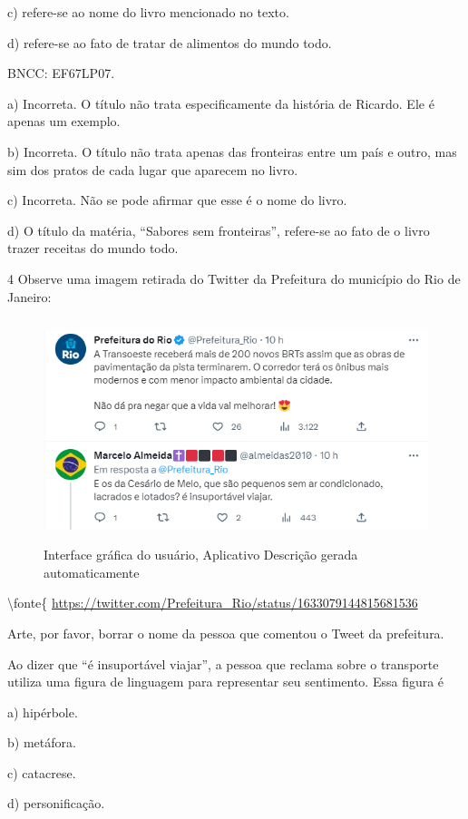 {c) refere-se ao nome do livro mencionado no texto.

d) refere-se ao fato de tratar de alimentos do mundo todo.

BNCC: EF67LP07.

a) Incorreta. O título não trata especificamente da história de Ricardo.
Ele é apenas um exemplo.

b) Incorreta. O título não trata apenas das fronteiras entre um país e
outro, mas sim dos pratos de cada lugar que aparecem no livro.

c) Incorreta. Não se pode afirmar que esse é o nome do livro.

d) O título da matéria, ``Sabores sem fronteiras'', refere-se ao fato de
o livro trazer receitas do mundo todo.

\num{4} Observe uma imagem retirada do Twitter da Prefeitura do
município do Rio de Janeiro:

\begin{figure}
\centering
\includegraphics[width=4.97543in,height=2.56689in]{./imgSAEB_6_POR/media/image6.png}
\caption{Interface gráfica do usuário, Aplicativo Descrição gerada
automaticamente}
\end{figure}

\textbackslash fonte\{
\href{https://twitter.com/Prefeitura_Rio/status/1633079144815681536}{{https://twitter.com/Prefeitura\_Rio/status/1633079144815681536}}

Arte, por favor, borrar o nome da pessoa que comentou o Tweet da
prefeitura.

Ao dizer que ``é insuportável viajar'', a pessoa que reclama sobre o
transporte utiliza uma figura de linguagem para representar seu
sentimento. Essa figura é

a) hipérbole.

b) metáfora.

c) catacrese.

d) personificação.

}

